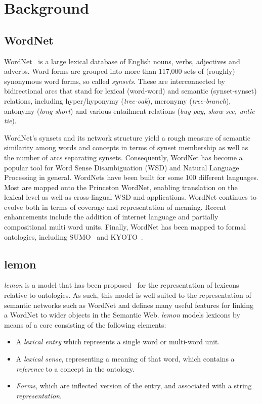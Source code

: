 \documentclass[10pt, a4paper]{article}
\newcommand{\lemon}[0]{\emph{lemon}}
\begin{document}
\section{Background}

\subsection{WordNet}

WordNet~\cite{miller1995wordnet,fellbaum1998wordnet,fellbaum2010wordnet} is a large lexical database of English nouns,
verbs, adjectives and adverbs. Word forms are grouped into more than 117,000 sets of
(roughly) synonymous word forms, so called \emph{synsets}. These are interconnected by bidirectional
arcs that stand for lexical (word-word) and semantic (synset-synset) relations, including
hyper/hyponymy (\emph{tree-oak}), meronymy (\emph{tree-branch}), antonymy
(\emph{long-short}) and various entailment relations (\emph{buy-pay, show-see, untie-
tie}).

WordNet's synsets and its network structure yield a rough measure of semantic similarity
among words and concepts in terms of synset membership as well as the number of arcs
separating synsets. Consequently, WordNet has become a popular tool for Word Sense
Disambiguation (WSD) and Natural Language Processing in general. WordNets have
been built for some 100 different languages. Most are mapped onto the Princeton
WordNet, enabling translation on the lexical level as well as cross-lingual WSD and
applications. WordNet continues to evolve both in terms of coverage and representation
of meaning. Recent enhancements include the addition of internet language and partially
compositional multi word units. Finally, WordNet has been mapped to formal ontologies, 
including SUMO~\cite{niles2003mapping} and KYOTO~\cite{vossen2014kyoto}.

\subsection{lemon}

\lemon{} is a model that has been proposed~\cite{mccrae2012interchanging} for the representation of
lexicons relative to ontologies. As such, this model is well suited to the
representation of semantic networks such as WordNet and defines many useful
features for linking a WordNet to wider objects in the Semantic Web. \lemon{}
models lexicons by means of a core consisting of the following elements:

\begin{itemize}
  \item A \emph{lexical entry} which represents a single word or multi-word
    unit.
  \item A \emph{lexical sense}, representing a meaning of that word, which
    contains a \emph{reference} to a concept in the ontology.
  \item \emph{Forms}, which are inflected version of the entry, and associated
    with a string \emph{representation}.
\end{itemize}
\end{document}
